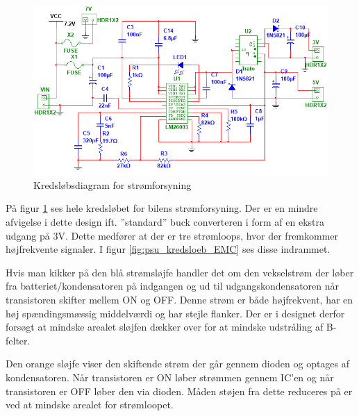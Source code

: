 \begin{landscape}
\begin{figure}
\centering
\includegraphics[height=\textwidth -3.2 cm]{../fig/diagrammer/bil/psu_kredsloeb}
\caption{Kredsløbsdiagram for strømforsyning}
\label{fig:psu_kredsloeb}
\end{figure}
\end{landscape}

\clearpage

På figur \ref{fig:psu_kredsloeb} ses hele kredsløbet for bilens strømforsyning. 
Der er en mindre afvigelse i dette design ift. ''standard'' buck converteren i form af en ekstra udgang på 3V.
Dette medfører at der er tre strømloops, hvor der fremkommer højfrekvente signaler.
I figur \ref{fig:psu_kredsloeb_EMC} ses disse indrammet.

Hvis man kikker på den blå strømsløjfe handler det om den vekselstrøm der løber fra batteriet/kondensatoren på indgangen og ud til udgangskondensatoren når transistoren skifter mellem ON og OFF. 
Denne strøm er både højfrekvent, har en høj spændingsmæssig middelværdi og har stejle flanker. 
Der er i designet derfor forsøgt at mindske arealet sløjfen dækker over for at mindske udstråling af B-felter.

Den orange sløjfe viser den skiftende strøm der går gennem dioden og optages af kondensatoren.
Når transistoren er ON løber strømmen gennem IC'en og når transistoren er OFF løber den via dioden.
Måden støjen fra dette reduceres på er ved at mindske arealet for strømloopet.

